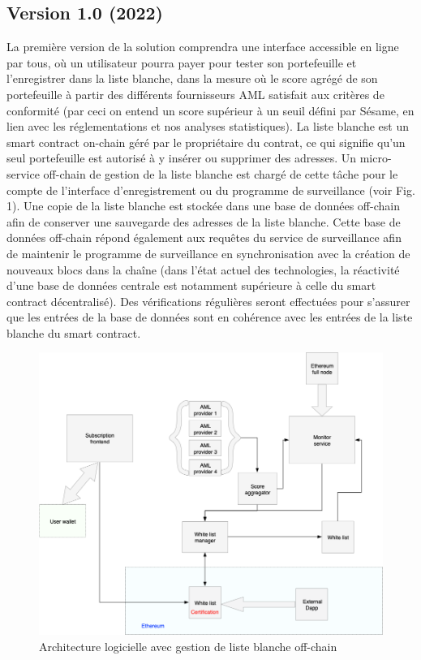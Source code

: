 ﻿\documentclass[a4paper]{article}
\begin{document}
\subsection{Version 1.0 (2022)}
La première version de la solution comprendra une interface accessible en ligne par tous, où un utilisateur pourra payer pour tester son portefeuille et l’enregistrer dans la liste blanche, dans la mesure où le score agrégé de son portefeuille à partir des différents fournisseurs AML satisfait aux critères de conformité (par ceci on entend un score supérieur à un seuil défini par Sésame, en lien avec les réglementations et nos analyses statistiques).
La liste blanche est un smart contract on-chain géré par le propriétaire du contrat, ce qui signifie qu'un seul portefeuille est autorisé à y insérer ou supprimer des adresses. Un micro-service off-chain de gestion de la liste blanche est chargé de cette tâche pour le compte de l'interface d'enregistrement ou du programme de surveillance (voir Fig. 1).
Une copie de la liste blanche est stockée dans une base de données off-chain afin de conserver une sauvegarde des adresses de la liste blanche. Cette base de données off-chain répond également aux requêtes du service de surveillance afin de maintenir le programme de surveillance en synchronisation avec la création de nouveaux blocs dans la chaîne (dans l’état actuel des technologies, la réactivité d'une base de données centrale est notamment supérieure à celle du smart contract décentralisé). Des vérifications régulières seront effectuées pour s'assurer que les entrées de la base de données sont en cohérence avec les entrées de la liste blanche du smart contract. \\

\begin{figure}[!h]
\centering
\includegraphics[scale=0.35]{architecture_v1_trim.png}
\caption{Architecture logicielle avec gestion de liste blanche off-chain}
\label{offchain}
\end{figure}
\end{document}
